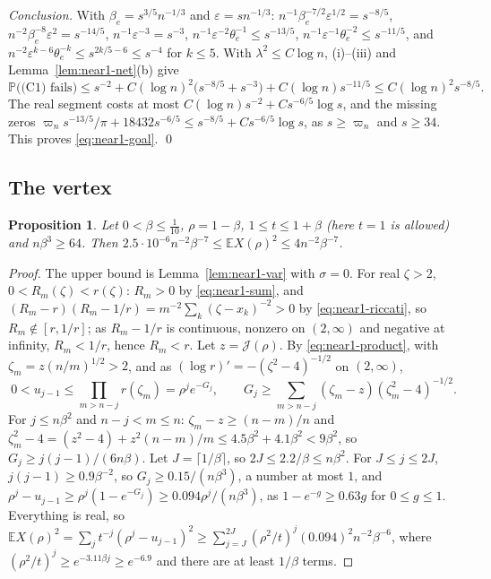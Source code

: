 \documentclass[11pt]{amsart}
\newtheorem{proposition}[theorem]{Proposition}
\theoremstyle{definition}
\theoremstyle{remark}
\numberwithin{equation}{section}
\newcommand{\E}{\mathbb{E}}
\newcommand{\PP}{\mathbb{P}}
\newcommand{\eps}{\varepsilon}
\begin{document}
\emph{Conclusion.} With $\beta_e=s^{3/5}n^{-1/3}$ and $\eps=sn^{-1/3}$: $n^{-1}\beta_e^{-7/2}\eps^{1/2}=s^{-8/5}$, $n^{-2}\beta_e^{-8}\eps^2=s^{-14/5}$, $n^{-1}\eps^{-3}=s^{-3}$, $n^{-1}\eps^{-2}\theta_e^{-1}\le s^{-13/5}$, $n^{-1}\eps^{-1}\theta_e^{-2}\le s^{-11/5}$, and $n^{-2}\eps^{k-6}\theta_e^{-k}\le s^{2k/5-6}\le s^{-4}$ for $k\le5$. With $\lambda^2\le C\log n$, (i)--(iii) and Lemma~\ref{lem:near1-net}(b) give
\[
\PP\bigl(\text{(C1) fails}\bigr)\le s^{-2}+C(\log n)^2\bigl(s^{-8/5}+s^{-3}\bigr)+C(\log n)s^{-11/5}\le C(\log n)^2s^{-8/5}.
\]
The real segment costs at most $C(\log n)s^{-2}+Cs^{-6/5}\log s$, and the missing zeros $\varpi_ns^{-13/5}/\pi+18432s^{-6/5}\le s^{-8/5}+Cs^{-6/5}\log s$, as $s\ge\varpi_n$ and $s\ge34$. This proves \eqref{eq:near1-goal}. \qed

\subsection{The vertex}

\begin{proposition}\label{prop:near1-vertex}
Let $0<\beta\le\frac1{10}$, $\rho=1-\beta$, $1\le t\le1+\beta$ (here $t=1$ is allowed) and $n\beta^3\ge64$. Then $2.5\cdot10^{-6}n^{-2}\beta^{-7}\le\E X(\rho)^2\le4n^{-2}\beta^{-7}$.
\end{proposition}

\begin{proof}
The upper bound is Lemma~\ref{lem:near1-var} with $\sigma=0$. For real $\zeta>2$, $0<R_m(\zeta)<r(\zeta)$: $R_m>0$ by \eqref{eq:near1-sum}, and $(R_m-r)(R_m-1/r)=m^{-2}\sum_k(\zeta-x_k)^{-2}>0$ by \eqref{eq:near1-riccati}, so $R_m\notin[r,1/r]$; as $R_m-1/r$ is continuous, nonzero on $(2,\infty)$ and negative at infinity, $R_m<1/r$, hence $R_m<r$. Let $z=\mathcal J(\rho)$. By \eqref{eq:near1-product}, with $\zeta_m=z(n/m)^{1/2}>2$, and as $(\log r)'=-(\zeta^2-4)^{-1/2}$ on $(2,\infty)$,
\[
0<u_{j-1}\le\prod_{m>n-j}r(\zeta_m)=\rho^je^{-G_j},\qquad G_j\ge\sum_{m>n-j}(\zeta_m-z)(\zeta_m^2-4)^{-1/2}.
\]
For $j\le n\beta^2$ and $n-j<m\le n$: $\zeta_m-z\ge(n-m)/n$ and $\zeta_m^2-4=(z^2-4)+z^2(n-m)/m\le4.5\beta^2+4.1\beta^2<9\beta^2$, so $G_j\ge j(j-1)/(6n\beta)$. Let $J=\lceil1/\beta\rceil$, so $2J\le2.2/\beta\le n\beta^2$. For $J\le j\le2J$, $j(j-1)\ge0.9\beta^{-2}$, so $G_j\ge0.15/(n\beta^3)$, a number at most $1$, and $\rho^j-u_{j-1}\ge\rho^j(1-e^{-G_j})\ge0.094\rho^j/(n\beta^3)$, as $1-e^{-g}\ge0.63g$ for $0\le g\le1$. Everything is real, so $\E X(\rho)^2=\sum_jt^{-j}(\rho^j-u_{j-1})^2\ge\sum_{j=J}^{2J}(\rho^2/t)^j(0.094)^2n^{-2}\beta^{-6}$, where $(\rho^2/t)^j\ge e^{-3.11\beta j}\ge e^{-6.9}$ and there are at least $1/\beta$ terms.
\end{proof}
\end{document}
